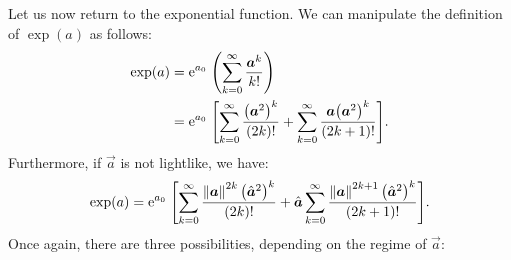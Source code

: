 Let us now return to the exponential function. We can manipulate the definition of \(\exp(a)\) as follows:
\begin{equation*}
    \begin{split}
        \exp(a) &= \ec^{a_0}\;\qty(\sum_{k=0}^\infty \frac{\vec{a}^k}{k!} ) \\
                &= \ec^{a_0}\;\qty[\sum_{k=0}^\infty \frac{\qty(\vec{a}^2)^k}{(2k)!}  + \sum_{k=0}^\infty \frac{\vec{a}\qty(\vec{a}^2)^k}{(2k+1)!}]. \\
    \end{split}
\end{equation*}
Furthermore, if \(\vec{a}\) is not lightlike, we have:
\begin{equation*}
    \exp(a) = \ec^{a_0}\;\qty[\sum_{k=0}^\infty \frac{\norm{\vec{a}}^{2k}\, \qty(\uvec{a}^2)^k}{(2k)!}  + \uvec{a}\sum_{k=0}^\infty \frac{\norm{\vec{a}}^{2k+1} \, \qty(\uvec{a}^2)^k}{(2k+1)!}].
\end{equation*}
Once again, there are three possibilities, depending on the regime of \(\vec{a}\):
